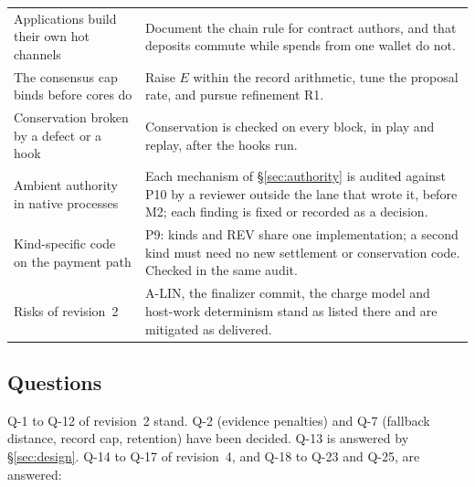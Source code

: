 \documentclass[11pt]{article}
\begin{document}
\begin{longtable}{@{}P{4.6cm}P{10.4cm}@{}}
Applications build their own hot channels & Document the chain rule for contract authors, and that deposits commute while spends from one wallet do not. \\
The consensus cap binds before cores do & Raise $E$ within the record arithmetic, tune the proposal rate, and pursue refinement R1. \\
Conservation broken by a defect or a hook & Conservation is checked on every block, in play and replay, after the hooks run. \\
Ambient authority in native processes & Each mechanism of \S\ref{sec:authority} is audited against P10 by a reviewer outside the lane that wrote it, before M2; each finding is fixed or recorded as a decision. \\
Kind-specific code on the payment path & P9: kinds and REV share one implementation; a second kind must need no new settlement or conservation code. Checked in the same audit. \\
Risks of revision~2 & A-LIN, the finalizer commit, the charge model and host-work determinism stand as listed there and are mitigated as delivered. \\
\bottomrule
\end{longtable}

\subsection{Questions}

Q-1 to Q-12 of revision~2 stand. Q-2 (evidence penalties) and Q-7 (fallback distance, record cap, retention) have been decided. Q-13 is answered by \S\ref{sec:design}. Q-14 to Q-17 of revision~4, and Q-18 to Q-23 and Q-25, are answered:
\end{document}
